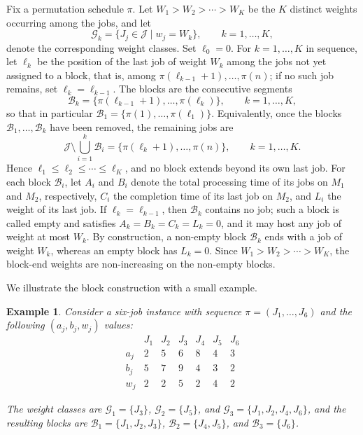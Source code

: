 \documentclass[12pt]{article}
\newtheorem{exam}{Example}[section]
\begin{document}
\begin{sloppypar}
Fix a permutation schedule $\pi$. Let $W_1 > W_2 > \cdots > W_K$ be the $K$ distinct weights
occurring among the jobs, and let
\[
\mathcal{G}_k = \{J_j \in \mathcal{J} \mid w_j = W_k\}, \qquad k = 1,\dots,K,
\]
denote the corresponding weight classes. Set $\ell_0 = 0$. For $k = 1,\dots,K$ in sequence, let
$\ell_k$ be the position of the last job of weight $W_k$ among the jobs not yet assigned to a block,
that is, among $\pi(\ell_{k-1}+1),\dots,\pi(n)$; if no such job remains, set $\ell_k = \ell_{k-1}$.
The blocks are the consecutive segments
\[
\mathcal{B}_k = \{\pi(\ell_{k-1}+1), \dots, \pi(\ell_k)\}, \qquad k = 1,\dots,K,
\]
so that in particular $\mathcal{B}_1 = \{\pi(1),\dots,\pi(\ell_1)\}$. Equivalently, once the blocks
$\mathcal{B}_1,\dots,\mathcal{B}_k$ have been removed, the remaining jobs are
\[
\mathcal{J}\setminus\bigcup_{i=1}^{k}\mathcal{B}_i = \{\pi(\ell_k+1),\dots,\pi(n)\}, \qquad k=1,\dots,K .
\]
Hence $\ell_1\le\ell_2\le\cdots\le\ell_K$, and no block extends beyond its own last job.
For each block $\mathcal{B}_i$, let $A_i$ and $B_i$ denote the total processing time of its jobs on
$M_1$ and $M_2$, respectively, $C_i$ the completion time of its last job on $M_2$, and $L_i$ the
weight of its last job. If $\ell_k = \ell_{k-1}$, then $\mathcal{B}_k$ contains no job; such a block
is called empty and satisfies $A_k = B_k = C_k = L_k = 0$, and it may host any job of weight at most
$W_k$. By construction, a non-empty block $\mathcal{B}_k$ ends with a job of weight $W_k$, whereas an
empty block has $L_k = 0$. Since $W_1 > W_2 > \cdots > W_K$, the block-end weights are non-increasing
on the non-empty blocks.

We illustrate the block construction with a small example.
\begin{exam}\label{ex:blocking}
Consider a six-job instance with sequence $\pi = (J_1, \dots, J_6)$ and the following $(a_j,b_j,w_j)$ values:
\[
\begin{array}{c|cccccc}
      & J_1 & J_2 & J_3 & J_4 & J_5 & J_6 \\
\hline
a_j &  2  &  5  &  6  &  8  &  4  &  3  \\
b_j &  5  &  7  &  9  &  4  &  3  &  2  \\
w_j &  2  &  2  &  5  &  2  &  4  &  2
\end{array}
\]

The weight classes are $\mathcal{G}_1=\{J_3\}$, $\mathcal{G}_2=\{J_5\}$, and
$\mathcal{G}_3=\{J_1,J_2,J_4,J_6\}$, and the resulting blocks are $\mathcal{B}_1=\{J_1,J_2,J_3\}$,
$\mathcal{B}_2=\{J_4,J_5\}$, and $\mathcal{B}_3=\{J_6\}$.
\end{exam}


\end{sloppypar}
\end{document}
